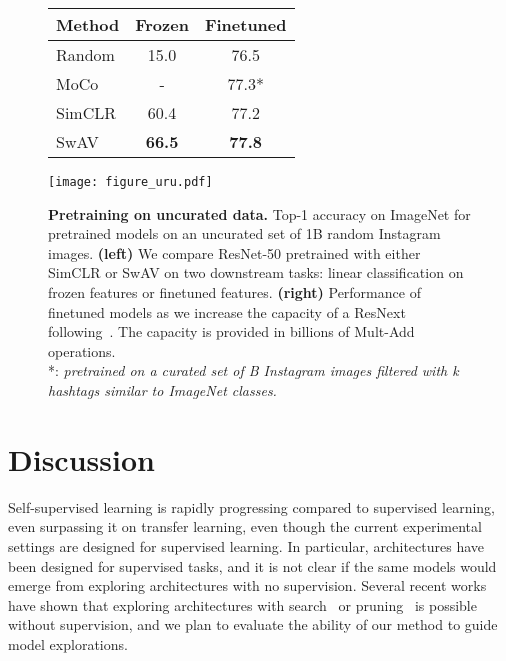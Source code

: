 \documentclass{article}
\def\OURS{SwAV\xspace}
\begin{document}
\begin{figure}[t]
\begin{minipage}{0.5\linewidth}
\centering


    \begin{tabular}{@{} l  c c @{}}
\toprule
Method  & Frozen & Finetuned \\
\midrule
Random  & 15.0 & 76.5\\
\midrule
MoCo  & - & \phantom{*}77.3*\\
SimCLR  & 60.4 & 77.2 \\
\OURS  & \bf 66.5 & \bf 77.8 \\
      \bottomrule
    \end{tabular}
\end{minipage}
\begin{minipage}{0.5\linewidth}
\centering
\texttt{[image: figure\_uru.pdf]} 
\end{minipage}
\vspace{-0.08in}
\caption{\textbf{Pretraining on uncurated data.}
Top-1 accuracy on ImageNet for pretrained models on an uncurated set of 1B random Instagram images.
\textbf{(left)} We compare ResNet-50 pretrained with either SimCLR or \OURS on two downstream tasks:
linear classification on frozen features or finetuned features.
\textbf{(right)}
Performance of finetuned models as we increase the capacity of a ResNext following~\cite{mahajan2018exploring}. 
The capacity is provided in billions of Mult-Add operations.\\
*: \footnotesize{\emph{pretrained on a curated set of B Instagram images filtered with k hashtags similar to ImageNet classes.}}
}
    \label{fig:insta}
\end{figure}


 
\section{Discussion}
Self-supervised learning is rapidly progressing compared to supervised learning, even surpassing it on transfer learning, even though the current experimental settings are designed for supervised learning.
In particular, architectures have been designed for supervised tasks, and it is not clear if the same models would emerge from exploring architectures with no supervision.
Several recent works have shown that exploring architectures with search~\cite{liu2020labels} or pruning~\cite{caron2020pruning} is possible without supervision, and we plan to evaluate the ability of our method to guide model explorations.
\end{document}
